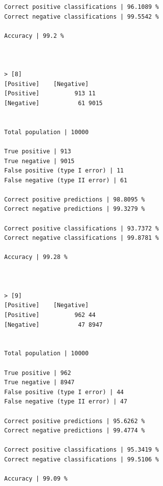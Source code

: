 \documentclass{classrep}
\begin{document}
{{{\begin{lstlisting}
                Correct positive classifications | 96.1089 %
                Correct negative classifications | 99.5542 %

                Accuracy | 99.2 %



                > [8]
                [Positive]    [Negative]
                [Positive]          913 11
                [Negative]           61 9015


                Total population | 10000

                True positive | 913
                True negative | 9015
                False positive (type I error) | 11
                False negative (type II error) | 61

                Correct positive predictions | 98.8095 %
                Correct negative predictions | 99.3279 %

                Correct positive classifications | 93.7372 %
                Correct negative classifications | 99.8781 %

                Accuracy | 99.28 %



                > [9]
                [Positive]    [Negative]
                [Positive]          962 44
                [Negative]           47 8947


                Total population | 10000

                True positive | 962
                True negative | 8947
                False positive (type I error) | 44
                False negative (type II error) | 47

                Correct positive predictions | 95.6262 %
                Correct negative predictions | 99.4774 %

                Correct positive classifications | 95.3419 %
                Correct negative classifications | 99.5106 %

                Accuracy | 99.09 %

                \end{lstlisting}
            }
        }
    }
\end{document}
